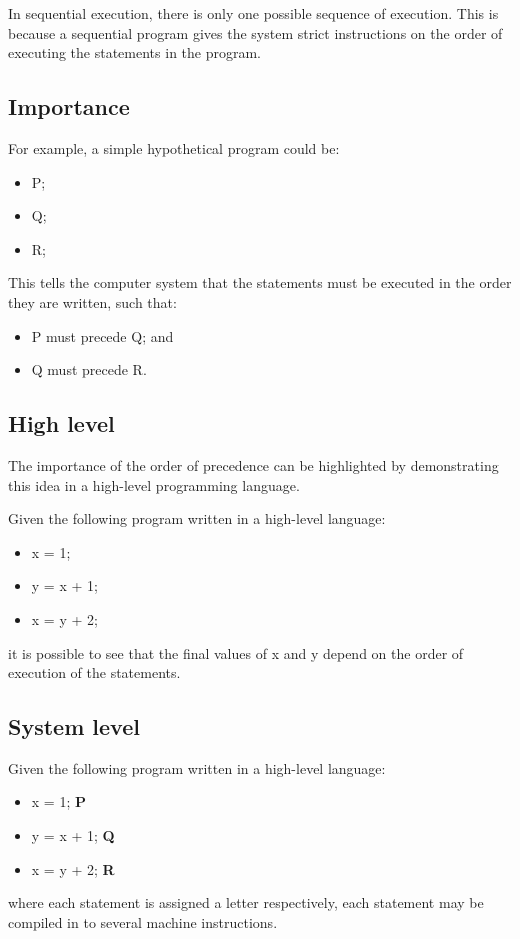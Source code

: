 \documentclass[a4paper]{systems-software}
\begin{document}
In sequential execution, there is only one possible sequence of execution. This is because a sequential program gives the system strict instructions on the order of executing the statements in the program.


\newpage

\subsection*{Importance}

For example, a simple hypothetical program could be:
\begin{itemize}
	\item[] P;
	\item[] Q;
	\item[] R;
\end{itemize}

This tells the computer system that the statements must be executed in the order they are written, such that:
\begin{itemize}
	\item P must precede Q; and
	\item Q must precede R.
\end{itemize}


\subsection*{High level}

The importance of the order of precedence can be highlighted by demonstrating this idea in a high-level programming language.

Given the following program written in a high-level language:
\begin{itemize}
	\item[] x = 1;
	\item[] y = x + 1;
	\item[] x = y + 2;
\end{itemize}
it is possible to see that the final values of x and y depend on the order of execution of the statements.


\subsection*{System level}

Given the following program written in a high-level language:
\begin{itemize}
	\item[] x = 1; \textbf{P}
	\item[] y = x + 1; \textbf{Q}
	\item[] x = y + 2; \textbf{R}
\end{itemize}
where each statement is assigned a letter respectively, each statement may be compiled in to several machine instructions.
\end{document}
